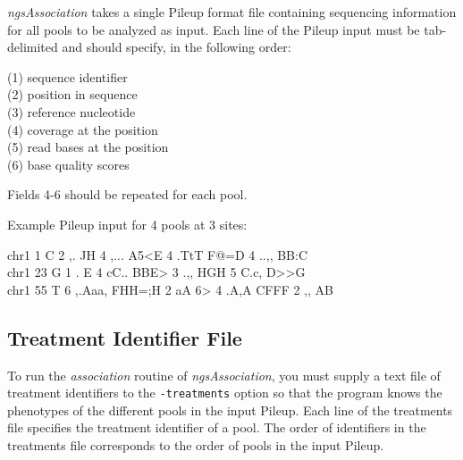 \documentclass[12pt]{article}
\newenvironment{codeblock}{ \begin{framed}\ttfamily}{ \end{framed} }
\begin{document}
\label{pileup}

\textit{ngsAssociation} takes a single Pileup format file containing sequencing information for all pools to be analyzed as input. Each line of the Pileup input must be tab-delimited and should specify, in the following order:

\vspace{5mm}

(1) sequence identifier\\
(2) position in sequence\\
(3) reference nucleotide\\
(4) coverage at the position\\
(5) read bases at the position\\
(6) base quality scores

\vspace{5mm}

Fields 4-6 should be repeated for each pool.

\vspace{5mm}

Example Pileup input for 4 pools at 3 sites:
\vspace{-0.5cm}
\begin{codeblock}
chr1	1	C	2	,.	JH	4	,...		A5<E	4	.TtT		F@=D	4	..,,	BB:C\\
chr1	23	G	1	.	E	4	cC..		BBE>	3	.,,		HGH	5	C.c,	D>>G\\
chr1	55	T	6	,.Aaa,	FHH=;H	2	aA		6>	4	.A,A		CFFF	2	,,	AB
\end{codeblock}

\subsection{Treatment Identifier File}

\label{treatfile}

To run the {\it association} routine of \textit{ngsAssociation}, you must supply a text file of treatment identifiers to the \texttt{-treatments} option so that the program knows the phenotypes of the different pools in the input Pileup. Each line of the treatments file specifies the treatment identifier of a pool. The order of identifiers in the treatments file corresponds to the order of pools in the input Pileup.

\vspace{5mm}
\end{document}
